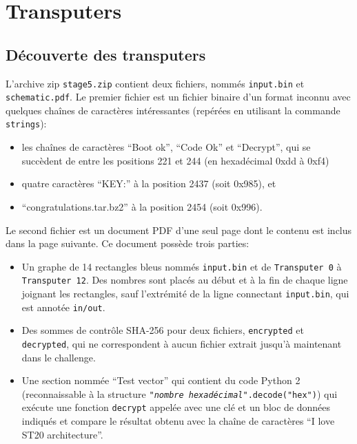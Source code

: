 \documentclass[a4paper,10pt]{article}
\begin{document}
\clearpage
\section{Transputers}

\subsection{Découverte des transputers}
\label{sec5-1}

L'archive zip \texttt{stage5.zip} contient deux fichiers, nommés \texttt{input.bin} et \texttt{schematic.pdf}.
Le premier fichier est un fichier binaire d'un format inconnu avec quelques chaînes de caractères intéressantes (repérées en utilisant la commande \texttt{strings}):
\begin{itemize}
  \item les chaînes de caractères ``Boot ok'', ``Code Ok'' et ``Decrypt'', qui se succèdent de entre les positions 221 et 244 (en hexadécimal 0xdd à 0xf4)
  \item quatre caractères ``KEY\string:'' à la position 2437 (soit 0x985), et
  \item ``congratulations.tar.bz2'' à la position 2454 (soit 0x996).
\end{itemize}

Le second fichier est un document PDF d'une seul page dont le contenu est inclus dans la page suivante.
Ce document possède trois parties:
\begin{itemize}
  \item Un graphe de 14 rectangles bleus nommés \texttt{input.bin} et de \texttt{Transputer 0} à \texttt{Transputer 12}. Des nombres sont placés au début et à la fin de chaque ligne joignant les rectangles, sauf l'extrémité de la ligne connectant \texttt{input.bin}, qui est annotée \texttt{in/out}.
  \item Des sommes de contrôle SHA-256 pour deux fichiers, \texttt{encrypted} et \texttt{decrypted}, qui ne correspondent à aucun fichier extrait jusqu'à maintenant dans le challenge.
  \item Une section nommée ``Test vector'' qui contient du code Python 2 (reconnaissable à la structure \texttt{"\emph{nombre hexadécimal}".decode("hex")}) qui exécute une fonction \texttt{decrypt} appelée avec une clé et un bloc de données indiqués et compare le résultat obtenu avec la chaîne de caractères ``I love ST20 architecture''.
\end{itemize}

\clearpage

\end{document}
